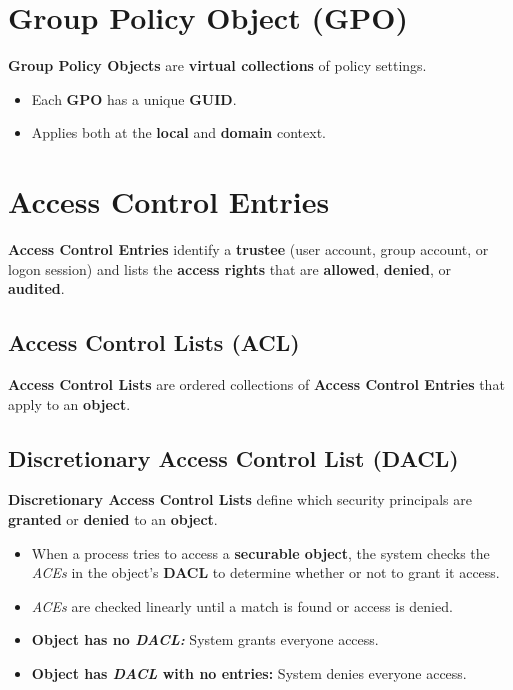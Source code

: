 \documentclass[12pt, letterpaper]{article}
\begin{document}
\section*{Group Policy Object (GPO)}

\textbf{Group Policy Objects} are \textbf{virtual collections} of policy settings.

\begin{itemize}
    \item Each \textbf{GPO} has a unique \textbf{GUID}.
    \item Applies both at the \textbf{local} and \textbf{domain} context. %
\end{itemize}

\section*{Access Control Entries}

\textbf{Access Control Entries} identify a \textbf{trustee} (user account, group account, or logon session) and lists the \textbf{access rights} that are \textbf{allowed}, \textbf{denied}, or \textbf{audited}.

\subsection*{Access Control Lists (ACL)}

\textbf{Access Control Lists} are ordered collections of \textbf{Access Control Entries} that apply to an \textbf{object}.

\subsection*{Discretionary Access Control List (DACL)}

\textbf{Discretionary Access Control Lists} define which security principals are \textbf{granted} or \textbf{denied} to an \textbf{object}.

\begin{itemize}
    \item When a process tries to access a \textbf{securable object}, the system checks the \textit{ACEs} in the object's \textbf{DACL} to determine whether or not to grant it access.
    \item \textit{ACEs} are checked linearly until a match is found or access is denied.
    \item \textbf{Object has no \textit{DACL:}} System grants everyone access.
    \item \textbf{Object has \textit{DACL} with no entries:} System denies everyone access.
\end{itemize}
\end{document}
